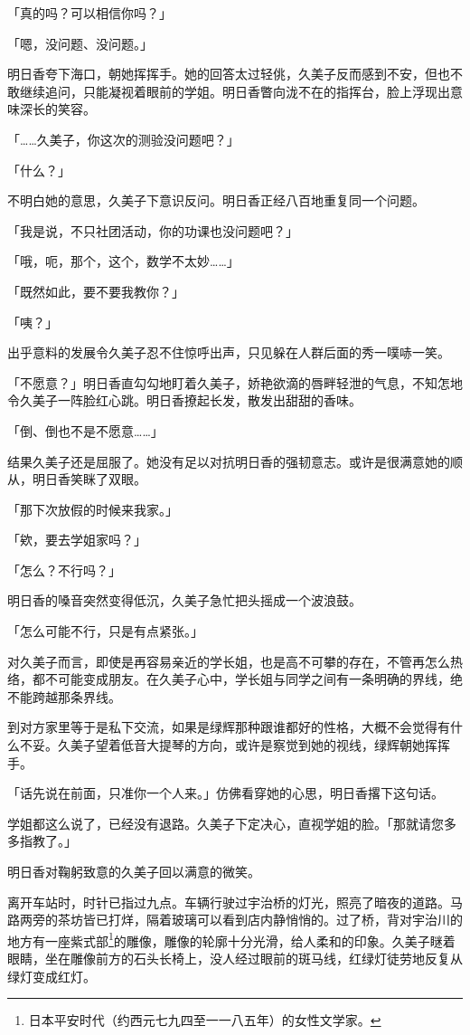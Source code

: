 \documentclass[UTF8]{ctexart}
\begin{document}
    「真的吗？可以相信你吗？」 

    「嗯，没问题、没问题。」 

    明日香夸下海口，朝她挥挥手。她的回答太过轻佻，久美子反而感到不安，但也不敢继续追问，只能凝视着眼前的学姐。明日香瞥向泷不在的指挥台，脸上浮现出意味深长的笑容。 

    「……久美子，你这次的测验没问题吧？」 

    「什么？」 

    不明白她的意思，久美子下意识反问。明日香正经八百地重复同一个问题。 

    「我是说，不只社团活动，你的功课也没问题吧？」 

    「哦，呃，那个，这个，数学不太妙……」 

    「既然如此，要不要我教你？」 

    「咦？」 

    出乎意料的发展令久美子忍不住惊呼出声，只见躲在人群后面的秀一噗哧一笑。 

    「不愿意？」明日香直勾勾地盯着久美子，娇艳欲滴的唇畔轻泄的气息，不知怎地令久美子一阵脸红心跳。明日香撩起长发，散发出甜甜的香味。 

    「倒、倒也不是不愿意……」 

    结果久美子还是屈服了。她没有足以对抗明日香的强韧意志。或许是很满意她的顺从，明日香笑眯了双眼。 

    「那下次放假的时候来我家。」 

    「欸，要去学姐家吗？」 

    「怎么？不行吗？」 

    明日香的嗓音突然变得低沉，久美子急忙把头摇成一个波浪鼓。 

    「怎么可能不行，只是有点紧张。」 

    对久美子而言，即使是再容易亲近的学长姐，也是高不可攀的存在，不管再怎么热络，都不可能变成朋友。在久美子心中，学长姐与同学之间有一条明确的界线，绝不能跨越那条界线。 

    到对方家里等于是私下交流，如果是绿辉那种跟谁都好的性格，大概不会觉得有什么不妥。久美子望着低音大提琴的方向，或许是察觉到她的视线，绿辉朝她挥挥手。 

    「话先说在前面，只准你一个人来。」仿佛看穿她的心思，明日香撂下这句话。 

    学姐都这么说了，已经没有退路。久美子下定决心，直视学姐的脸。「那就请您多多指教了。」 

    明日香对鞠躬致意的久美子回以满意的微笑。 

    离开车站时，时针已指过九点。车辆行驶过宇治桥的灯光，照亮了暗夜的道路。马路两旁的茶坊皆已打烊，隔着玻璃可以看到店内静悄悄的。过了桥，背对宇治川的地方有一座紫式部\footnote{日本平安时代（约西元七九四至一一八五年）的女性文学家。}的雕像，雕像的轮廓十分光滑，给人柔和的印象。久美子瞇着眼睛，坐在雕像前方的石头长椅上，没人经过眼前的斑马线，红绿灯徒劳地反复从绿灯变成红灯。
\end{document}
